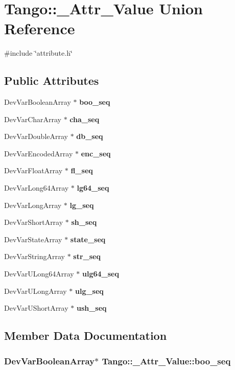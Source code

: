\section{Tango\-:\-:\-\_\-\-Attr\-\_\-\-Value Union Reference}
\label{unionTango_1_1__Attr__Value}


{\ttfamily \#include \char`\"{}attribute.\-h\char`\"{}}

\subsection*{Public Attributes}
\begin{DoxyCompactItemize}
\item 
Dev\-Var\-Boolean\-Array $\ast$ {\bf boo\-\_\-seq}
\item 
Dev\-Var\-Char\-Array $\ast$ {\bf cha\-\_\-seq}
\item 
Dev\-Var\-Double\-Array $\ast$ {\bf db\-\_\-seq}
\item 
Dev\-Var\-Encoded\-Array $\ast$ {\bf enc\-\_\-seq}
\item 
Dev\-Var\-Float\-Array $\ast$ {\bf fl\-\_\-seq}
\item 
Dev\-Var\-Long64\-Array $\ast$ {\bf lg64\-\_\-seq}
\item 
Dev\-Var\-Long\-Array $\ast$ {\bf lg\-\_\-seq}
\item 
Dev\-Var\-Short\-Array $\ast$ {\bf sh\-\_\-seq}
\item 
Dev\-Var\-State\-Array $\ast$ {\bf state\-\_\-seq}
\item 
Dev\-Var\-String\-Array $\ast$ {\bf str\-\_\-seq}
\item 
Dev\-Var\-U\-Long64\-Array $\ast$ {\bf ulg64\-\_\-seq}
\item 
Dev\-Var\-U\-Long\-Array $\ast$ {\bf ulg\-\_\-seq}
\item 
Dev\-Var\-U\-Short\-Array $\ast$ {\bf ush\-\_\-seq}
\end{DoxyCompactItemize}


\subsection{Member Data Documentation}
\subsubsection[{boo\-\_\-seq}]{\setlength{\rightskip}{0pt plus 5cm}Dev\-Var\-Boolean\-Array$\ast$ Tango\-::\-\_\-\-Attr\-\_\-\-Value\-::boo\-\_\-seq}\label{unionTango_1_1__Attr__Value_a09041dfdd3ceb12b9d5d2ff6d7672e82}
